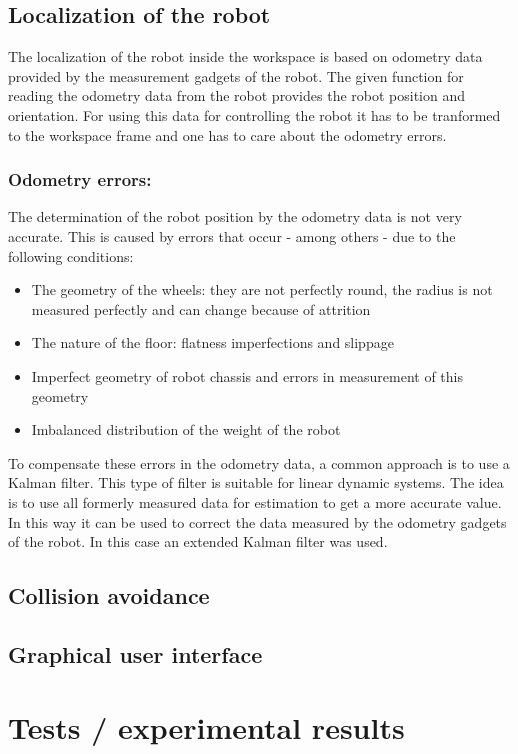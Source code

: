\documentclass[a4paper,11pt]{article}
\begin{document}
\subsection{Localization of the robot}
The localization of the robot inside the workspace is based on odometry data provided by the measurement gadgets of the robot. The given function for reading the odometry data from the robot provides the robot position and orientation. For using this data for controlling the robot it has to be tranformed to the workspace frame and one has to care about the odometry errors.
\subsubsection*{Odometry errors:}
The determination of the robot position by the odometry data is not very accurate. This is caused by errors that occur - among others - due to the following conditions:

\begin{itemize}
\item The geometry of the wheels: they are not perfectly round, the radius is not measured perfectly and can change because of attrition
\item The nature of the floor: flatness imperfections and slippage
\item Imperfect geometry of robot chassis and errors in measurement of this geometry
\item Imbalanced distribution of the weight of the robot
\end{itemize}

To compensate these errors in the odometry data, a common approach is to use a Kalman filter. This type of filter is suitable for linear dynamic systems. The idea is to use all formerly measured data for estimation to get a more accurate value. In this way it can be used to correct the data measured by the odometry gadgets of the robot. In this case an extended Kalman filter was used.

\subsection{Collision avoidance}
\subsection{Graphical user interface}

\section{Tests / experimental results}
\end{document}

